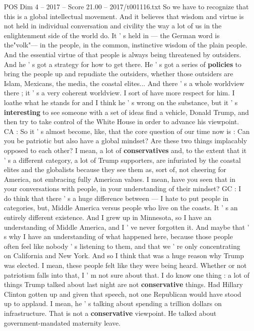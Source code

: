 \begin{textsample}{POS Dim 4 – 2017 – Score 21.00 – 2017/t001116.txt}
So we have to recognize that this is a global intellectual movement.
And it believes that wisdom and virtue is not held in individual conversation and civility the way a lot of us in the enlightenment side of the world do.
It ' s held in — the German word is the"volk"— in the people, in the common, instinctive wisdom of the plain people.
And the essential virtue of that people is always being threatened by outsiders.
And he ' s got a strategy for how to get there.
He ' s got a series of \textbf{policies} to bring the people up and repudiate the outsiders, whether those outsiders are Islam, Mexicans, the media, the coastal elites...
And there ' s a whole worldview there ; it ' s a very coherent worldview.
I sort of have more respect for him.
I loathe what he stands for and I think he ' s wrong on the substance, but it ' s \textbf{interesting} to see someone with a set of ideas find a vehicle, Donald Trump, and then try to take control of the White House in order to advance his viewpoint.
CA : So it ' s almost become, like, that the core question of our time now is : Can you be patriotic but also have a global mindset?
Are these two things implacably opposed to each other?
I mean, a lot of \textbf{conservatives} and, to the extent that it ' s a different category, a lot of Trump supporters, are infuriated by the coastal elites and the globalists because they see them as, sort of, not cheering for America, not embracing fully American values.
I mean, have you seen that in your conversations with people, in your understanding of their mindset?
GC : I do think that there ' s a huge difference between — I hate to put people in categories, but, Middle America versus people who live on the coasts.
It ' s an entirely different existence.
And I grew up in Minnesota, so I have an understanding of Middle America, and I ' ve never forgotten it.
And maybe that ' s why I have an understanding of what happened here, because those people often feel like nobody ' s listening to them, and that we ' re only concentrating on California and New York.
And so I think that was a huge reason why Trump was elected.
I mean, these people felt like they were being heard.
Whether or not patriotism falls into that, I ' m not sure about that.
I do know one thing : a lot of things Trump talked about last night are not \textbf{conservative} things.
Had Hillary Clinton gotten up and given that speech, not one Republican would have stood up to applaud.
I mean, he ' s talking about spending a trillion dollars on infrastructure.
That is not a \textbf{conservative} viewpoint.
He talked about government-mandated maternity leave.

\end{textsample}
